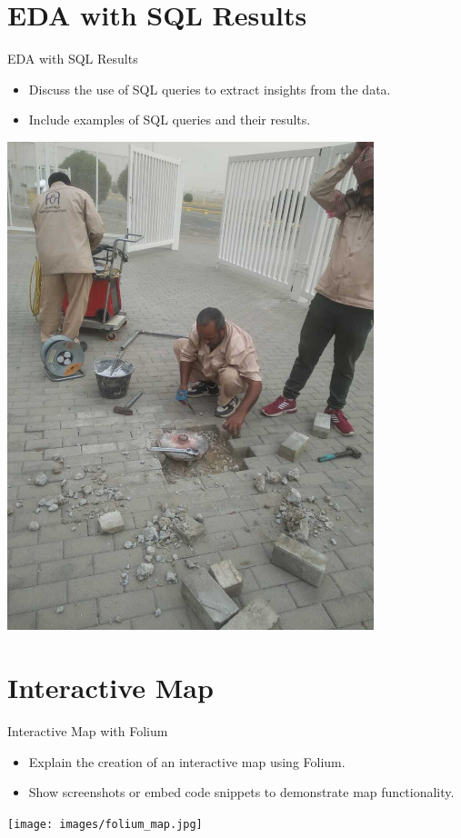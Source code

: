 \documentclass{beamer}
\begin{document}
\section{EDA with SQL Results}
\begin{frame}{EDA with SQL Results}
    \begin{itemize}
        \item Discuss the use of SQL queries to extract insights from the data.
        \item Include examples of SQL queries and their results.
    \end{itemize}
    \includegraphics[width=0.8\textwidth]{images/sql_results.jpg}
\end{frame}

\section{Interactive Map}
\begin{frame}{Interactive Map with Folium}
    \begin{itemize}
        \item Explain the creation of an interactive map using Folium.
        \item Show screenshots or embed code snippets to demonstrate map functionality.
    \end{itemize}
    \texttt{[image: images/folium\_map.jpg]}
\end{frame}
\end{document}
